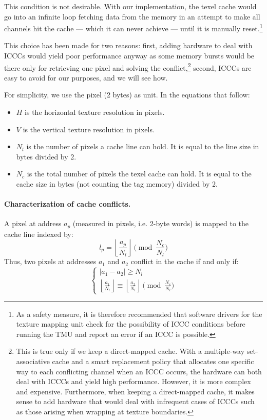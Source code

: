 \documentclass[a4paper,11pt]{kthesis}
\begin{document}
This condition is not desirable. With our implementation, the texel cache would go into an infinite loop fetching data from the memory in an attempt to make all channels hit the cache --- which it can never achieve --- until it is manually reset.\footnote{As a safety measure, it is therefore recommended that software drivers for the texture mapping unit check for the possibility of ICCC conditions before running the TMU and report an error if an ICCC is possible.}

This choice has been made for two reasons: first, adding hardware to deal with ICCCs would yield poor performance anyway as some memory bursts would be there only for retrieving one pixel and solving the conflict,\footnote{This is true only if we keep a direct-mapped cache. With a multiple-way set-associative cache and a smart replacement policy that allocates one specific way to each conflicting channel when an ICCC occurs, the hardware can both deal with ICCCs and yield high performance. However, it is more complex and expensive. Furthermore, when keeping a direct-mapped cache, it makes sense to add hardware that would deal with infrequent cases of ICCCs such as those arising when wrapping at texture boundaries.} second, ICCCs are easy to avoid for our purposes, and we will see how.

For simplicity, we use the pixel (2 bytes) as unit. In the equations that follow:
\begin{itemize}
\item $H$ is the horizontal texture resolution in pixels.
\item $V$ is the vertical texture resolution in pixels.
\item $N_{l}$ is the number of pixels a cache line can hold. It is equal to the line size in bytes divided by 2.
\item $N_{c}$ is the total number of pixels the texel cache can hold. It is equal to the cache size in bytes (not counting the tag memory) divided by 2.
\end{itemize}

\paragraph{Characterization of cache conflicts.} A pixel at address $a_{p}$ (measured in pixels, i.e. 2-byte words) is mapped to the cache line indexed by:
\begin{equation}
l_{p} = \left\lfloor \frac{a_{p}}{N_{l}} \right\rfloor \pmod{\frac{N_{c}}{N_{l}}}
\end{equation}
Thus, two pixels at addresses $a_{1}$ and $a_{2}$ conflict in the cache if and only if:
\begin{equation}\label{eq:cacheconflict}
\begin{cases}
|a_{1}-a_{2}| \geq N_{l} \\
\left\lfloor \frac{a_{1}}{N_{l}} \right\rfloor \equiv \left\lfloor \frac{a_{2}}{N_{l}} \right\rfloor \pmod{\frac{N_{c}}{N_{l}}}
\end{cases}
\end{equation}
\end{document}
